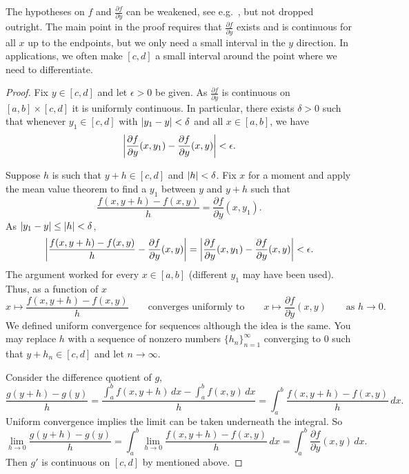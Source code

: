 The hypotheses on $f$ and $\frac{\partial f}{\partial y}$ can be
weakened, see e.g.\ ,
but not dropped outright.
The main point in the proof requires that
$\frac{\partial f}{\partial y}$ exists and is continuous for all $x$
up to the endpoints, but we only need a small
interval in the $y$ direction.  In applications, we often make $[c,d]$ a
small interval around the point where we need to differentiate.

\begin{proof}
Fix $y \in [c,d]$ and let $\epsilon > 0$ be given.
As $\frac{\partial f}{\partial y}$ is continuous on $[a,b] \times [c,d]$ it
is uniformly continuous.  In particular, there exists $\delta > 0$ such that
whenever $y_1 \in [c,d]$ with
$\lvert {y_1-y} \rvert < \delta$ and all $x \in [a,b]$, we have
\begin{equation*}
\left\lvert {\frac{\partial f}{\partial y}(x,y_1)-\frac{\partial f}{\partial y}(x,y)} \right\rvert < \epsilon .
\end{equation*}

Suppose $h$ is such that $y+h \in [c,d]$ and $\lvert {h} \rvert < \delta$.
Fix $x$ for a moment
and apply the mean value theorem to find a $y_1$ between $y$ and $y+h$ such that
\begin{equation*}
\frac{f(x,y+h)-f(x,y)}{h}
=
\frac{\partial f}{\partial y}(x,y_1) .
\end{equation*}
As $\lvert {y_1-y} \rvert \leq \lvert {h} \rvert < \delta$,
\begin{equation*}
\left\lvert {
\frac{f(x,y+h)-f(x,y)}{h}
-
\frac{\partial f}{\partial y}(x,y) 
} \right\rvert
=
\left\lvert {
\frac{\partial f}{\partial y}(x,y_1) 
-
\frac{\partial f}{\partial y}(x,y) 
} \right\rvert
< \epsilon .
\end{equation*}
The argument worked for every $x \in [a,b]$ (different $y_1$ may have been
used).  Thus, as a function of
$x$
\begin{equation*}
x \mapsto \frac{f(x,y+h)-f(x,y)}{h}
\qquad
\text{converges uniformly to}
\qquad
x \mapsto \frac{\partial f}{\partial y}(x,y)
\qquad
\text{as } h \to 0 .
\end{equation*}
We defined uniform convergence for sequences although the idea is the
same.  You may replace $h$ with a sequence of nonzero 
numbers $\{ h_n \}_{n=1}^\infty$
converging to $0$ such that $y+h_n \in [c,d]$ and let $n \to \infty$.

Consider the difference quotient of $g$,
\begin{equation*}
\frac{g(y+h)-g(y)}{h}
=
\frac{\int_a^b f(x,y+h) \,dx -
\int_a^b f(x,y) \,dx }{h}
=
\int_a^b \frac{f(x,y+h)-f(x,y)}{h} \,dx .
\end{equation*}
Uniform convergence implies the limit can be taken underneath the integral.
So
\begin{equation*}
\lim_{h\to 0}
\frac{g(y+h)-g(y)}{h}
= 
\int_a^b 
\lim_{h\to 0}
\frac{f(x,y+h)-f(x,y)}{h} \,dx 
=
\int_a^b 
\frac{\partial f}{\partial y}(x,y) \,dx .
\end{equation*}
Then $g'$ is continuous on $[c,d]$ by
 mentioned above.
\end{proof}

